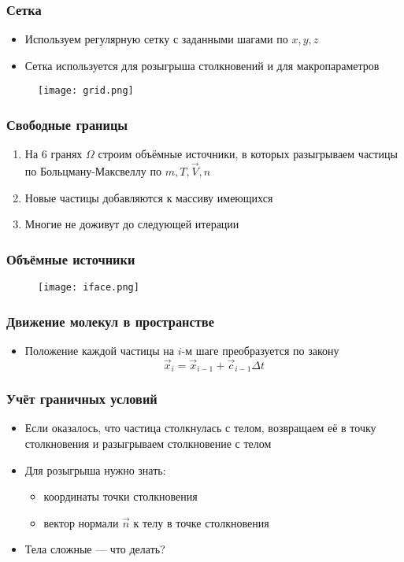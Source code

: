 \documentclass[onlymath]{beamer}
\begin{document}
\begin{frame}
  \frametitle{Сетка}
  \begin{itemize}
  \item Используем регулярную сетку с заданными шагами по $x, y, z$
  \item Сетка используется для розыгрыша столкновений и для
    макропараметров
  \end{itemize}
  \begin{figure}
    \centering
    \texttt{[image: grid.png]}
  \end{figure}
\end{frame}

\begin{frame}
  \frametitle{Свободные границы}
  \begin{enumerate}
  \item На 6 гранях $\Omega$ строим объёмные источники, в которых
    разыгрываем частицы по Больцману-Максвеллу по $m, T, \vec{V}, n$
  \item Новые частицы добавляются к массиву имеющихся
  \item Многие не доживут до следующей итерации
  \end{enumerate}
\end{frame}

\begin{frame}
  \frametitle{Объёмные источники}
  \begin{figure}
    \centering
    \texttt{[image: iface.png]}
  \end{figure}
\end{frame}

\begin{frame}
  \frametitle{Движение молекул в пространстве}
  \begin{itemize}
  \item Положение каждой частицы на $i$-м шаге преобразуется по закону
    \begin{equation*}
      \vec{x}_i = \vec{x}_{i-1} + \vec{c}_{i-1} \Delta t
    \end{equation*}
  \end{itemize}
\end{frame}

\begin{frame}[fragile]
  \frametitle{Учёт граничных условий}
  \begin{itemize}
  \item Если оказалось, что частица столкнулась с телом, возвращаем её
    в точку столкновения и разыгрываем столкновение с телом
  \item Для розыгрыша нужно знать:
    \begin{itemize}
      \item координаты точки столкновения
      \item вектор нормали $\vec{n}$ к телу в точке столкновения
    \end{itemize}
  \item Тела сложные — что делать?
  \end{itemize}
\end{frame}
\end{document}
